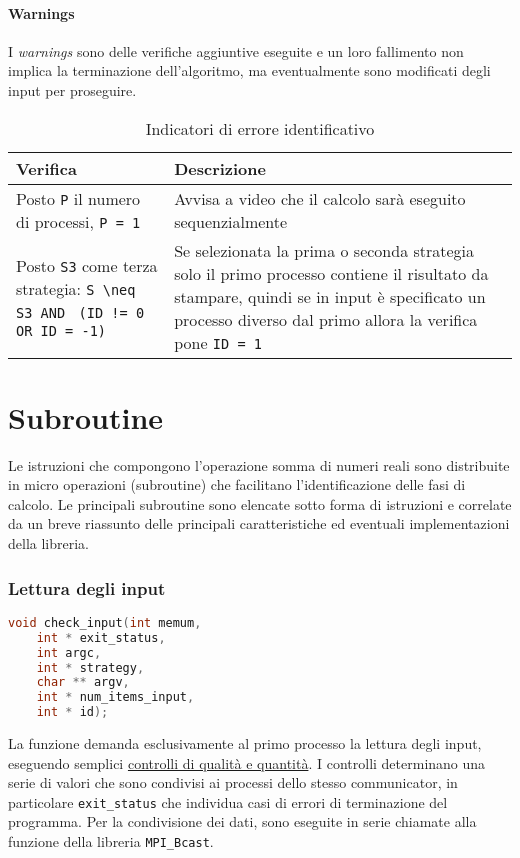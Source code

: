 \documentclass[a4paper,11pt]{book}
\begin{document}
\subsubsection{Warnings}
I \textit{warnings} sono delle verifiche aggiuntive eseguite e un loro fallimento non implica la terminazione dell'algoritmo, ma eventualmente sono modificati degli input per proseguire.
\begin{table}[H]
    \begin{tabular}{| p{} | p{} |}
        \hline
        \rowcolor{header}
        \textbf{Verifica} & \textbf{Descrizione} \\
        \hline
        Posto \verb|P| il numero di processi, \verb|P = 1| & 
        Avvisa a video che il calcolo sarà eseguito sequenzialmente\\
        \hline
        Posto \verb|S3| come terza strategia: \verb|S \neq S3 AND| \verb| (ID != 0 OR ID = -1)| & 
        Se selezionata la prima o seconda strategia solo il primo processo contiene il risultato da stampare, quindi se in input è specificato un processo diverso dal primo allora la verifica pone \verb|ID = 1| \\
        \hline
    \end{tabular}
    \caption{Indicatori di errore identificativo}
    \label{tab:Indicatori di errore identificativo}
\end{table}

\chapter{Subroutine}
Le istruzioni che compongono l'operazione somma di numeri reali sono distribuite in micro operazioni (subroutine) che facilitano l'identificazione delle fasi di calcolo. Le principali subroutine sono elencate sotto forma di istruzioni e correlate da un breve riassunto delle principali caratteristiche ed eventuali implementazioni della libreria.

\subsection{Lettura degli input}
\begin{lstlisting}[language=C]
void check_input(int memum, 
    int * exit_status, 
    int argc,
    int * strategy,
    char ** argv, 
    int * num_items_input, 
    int * id);
\end{lstlisting}
La funzione demanda esclusivamente al primo processo la lettura degli input, eseguendo semplici \underline{controlli di qualità e quantità}. I controlli determinano una serie di valori che sono condivisi ai processi dello stesso communicator, in particolare \verb|exit_status| che individua casi di errori di terminazione del programma. Per la condivisione dei dati, sono eseguite in serie chiamate alla funzione della libreria \verb|MPI_Bcast|.
\end{document}
